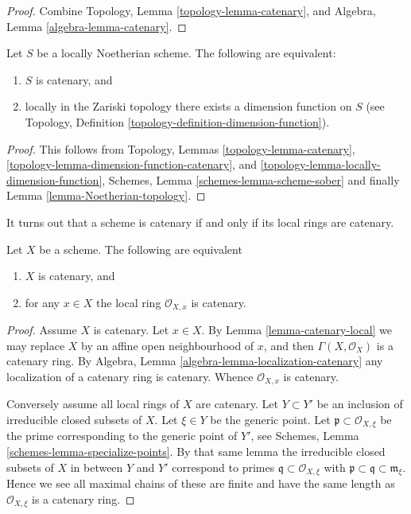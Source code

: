 \begin{proof}
Combine Topology, Lemma \ref{topology-lemma-catenary}, and
Algebra, Lemma \ref{algebra-lemma-catenary}.
\end{proof}

\begin{lemma}
\label{lemma-catenary-dimension-function}
Let $S$ be a locally Noetherian scheme.
The following are equivalent:
\begin{enumerate}
\item $S$ is catenary, and
\item locally in the Zariski topology there exists a dimension function
on $S$ (see Topology, Definition \ref{topology-definition-dimension-function}).
\end{enumerate}
\end{lemma}

\begin{proof}
This follows from
Topology, Lemmas
\ref{topology-lemma-catenary},
\ref{topology-lemma-dimension-function-catenary}, and
\ref{topology-lemma-locally-dimension-function},
Schemes, Lemma \ref{schemes-lemma-scheme-sober}
and finally Lemma \ref{lemma-Noetherian-topology}.
\end{proof}

\noindent
It turns out that a scheme is catenary if and only if its local
rings are catenary.

\begin{lemma}
\label{lemma-catenary-local-rings-catenary}
Let $X$ be a scheme. The following are equivalent
\begin{enumerate}
\item $X$ is catenary, and
\item for any $x \in X$ the local ring $\mathcal{O}_{X, x}$ is
catenary.
\end{enumerate}
\end{lemma}

\begin{proof}
Assume $X$ is catenary. Let $x \in X$. By Lemma \ref{lemma-catenary-local}
we may replace $X$ by an affine open neighbourhood of $x$, and
then $\Gamma(X, \mathcal{O}_X)$ is a catenary ring. By
Algebra, Lemma \ref{algebra-lemma-localization-catenary} any
localization of a catenary ring is
catenary. Whence $\mathcal{O}_{X, x}$ is catenary.

\medskip\noindent
Conversely assume all local rings of $X$ are catenary.
Let $Y \subset Y'$ be an inclusion of irreducible closed
subsets of $X$. Let $\xi \in Y$ be the generic point.
Let $\mathfrak p \subset \mathcal{O}_{X, \xi}$ be the prime
corresponding to the generic point of $Y'$, see
Schemes, Lemma \ref{schemes-lemma-specialize-points}. By that same
lemma the irreducible closed subsets of $X$ in between $Y$ and $Y'$
correspond to primes $\mathfrak q \subset \mathcal{O}_{X, \xi}$
with $\mathfrak p \subset \mathfrak q \subset \mathfrak m_{\xi}$.
Hence we see all maximal chains of these are finite and have the
same length as $\mathcal{O}_{X, \xi}$ is a catenary ring.
\end{proof}






